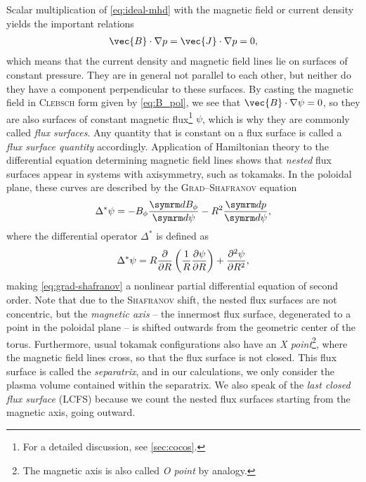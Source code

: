 Scalar multiplication of \cref{eq:ideal-mhd} with the magnetic field or current density yields the important relations
\begin{gather}
  \vec{B} \cdot \grad p = \vec{J} \cdot \grad p = 0,
\end{gather}
which means that the current density and magnetic field lines lie on surfaces of constant pressure. They are in general not parallel to each other, but neither do they have a component perpendicular to these surfaces. By casting the magnetic field in \textsc{Clebsch} form given by \cref{eq:B_pol}, we see that $\vec{B} \cdot \grad \psi = 0$, so they are also surfaces of constant magnetic flux\footnote{For a detailed discussion, see \cref{sec:cocos}.} $\psi$, which is why they are commonly called \emph{flux surfaces}. Any quantity that is constant on a flux surface is called a \emph{flux surface quantity} accordingly. Application of Hamiltonian theory to the differential equation determining magnetic field lines shows that \emph{nested} flux surfaces appear in systems with axisymmetry, such as tokamaks. In the poloidal plane, these curves are described by the \textsc{Grad}--\textsc{Shafranov} equation
\begin{gather}
  \Delta^{*} \psi = -B_{\phi} \frac{\diff B_{\phi}}{\diff \psi} - R^{2} \frac{\diff p}{\diff \psi}, \label{eq:grad-shafranov}
\end{gather}
where the differential operator $\Delta^{*}$ is defined as
\begin{gather}
  \Delta^{*} \psi = R \pd{R} \left ( \frac{1}{R} \pd[\psi]{R} \right ) + \frac{\partial^{2} \psi}{\partial R^{2}},
\end{gather}
making \cref{eq:grad-shafranov} a nonlinear partial differential equation of second order. Note that due to the \textsc{Shafranov} shift, the nested flux surfaces are not concentric, but the \emph{magnetic axis} -- the innermost flux surface, degenerated to a point in the poloidal plane -- is shifted outwards from the geometric center of the torus. Furthermore, usual tokamak configurations also have an \emph{X point}\footnote{The magnetic axis is also called \emph{O point} by analogy.}, where the magnetic field lines cross, so that the flux surface is not closed. This flux surface is called the \emph{separatrix}, and in our calculations, we only consider the plasma volume contained within the separatrix. We also speak of the \emph{last closed flux surface} (LCFS) because we count the nested flux surfaces starting from the magnetic axis, going outward.


